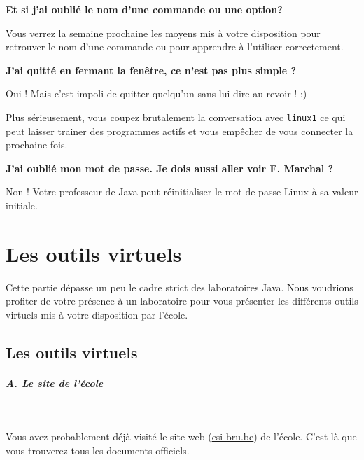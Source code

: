 \documentclass[a4paper,11pt]{article}
\begin{document}
\par
 \textbf{Et si j'ai oubli\'e le nom d'une commande ou une option?}
 \par
         
Vous verrez la semaine prochaine les moyens mis \`a votre disposition pour retrouver le nom d'une commande ou pour apprendre \`a l'utiliser correctement.
						
 \par
\textbf{J'ai quitt\'e en fermant la fen\^etre, ce n'est pas plus simple ?}
\par
        
Oui ! Mais c'est impoli de quitter quelqu'un sans lui dire au revoir ! ;) 
						
\par
Plus s\'erieusement, vous coupez brutalement la conversation avec \verb_linux1_ ce qui peut laisser trainer des programmes actifs et vous emp\^echer de vous connecter la prochaine fois.
						
\par
 \textbf{J'ai oubli\'e mon mot de passe. Je dois aussi aller voir F. Marchal ?}
 \par
        
Non ! Votre professeur de Java peut r\'einitialiser le mot de passe Linux \`a sa valeur initiale.
						
 \par

\section{Les outils virtuels}
Cette partie d\'epasse un peu le cadre strict des laboratoires Java. Nous voudrions profiter de votre pr\'esence \`a un laboratoire pour vous pr\'esenter les diff\'erents outils virtuels mis \`a votre disposition par l'\'ecole.
\par

\subsection{Les outils virtuels}
\subparagraph{A. Le site de l'\'ecole} 
		
\textcolor{white}{.} \par
				
Vous avez probablement d\'ej\`a visit\'e le site web (\url{esi-bru.be}) de l'\'ecole. C'est l\`a que vous trouverez tous les documents officiels.
			
\end{document}
